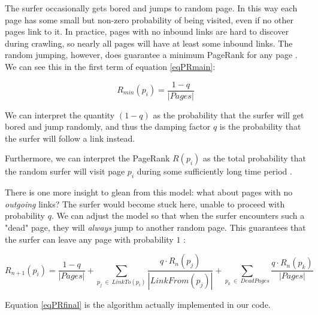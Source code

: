 The surfer occasionally gets bored and jumps to random page.  
In this way each page has some small but non-zero probability of being visited,
even if no other pages link to it.  In practice, pages with no inbound links are
hard to discover during crawling, so nearly all pages will have at least some
inbound links.  The random jumping, however, does guarantee a minimum PageRank
for any page \cite{efactory}. 
We can see this in the first term of equation \eqref{eqPRmain}:

\begin{equation}\label{eqPRmin}
    R_{min}(p_i) = \frac{1 - q}{|Pages|}
\end{equation}

We can interpret the quantity $(1 - q)$ as the probability that the surfer will
get bored and jump randomly, and thus the damping factor $q$ is the probability 
that the surfer will follow a link instead.

Furthermore, we can interpret the PageRank $R(p_i)$ as the total probability that
the random surfer will visit page $p_i$ during some sufficiently long time period \cite{efactory}.

There is one more insight to glean from this model: what about pages with no
\emph{outgoing} links?  The surfer would become stuck here, unable to proceed with
probability $q$.  We can adjust the model so that when the surfer encounters such
a "dead" page, they will \emph{always} jump to another random page.  This guarantees
that the surfer can leave any page with probability $1$ \cite{mnielsen}:

\begin{equation}\label{eqPRfinal}
    R_{n+1}(p_i) = \frac{1 - q}{|Pages|} + \sum_{p_j \: \in \: LinkTo(p_i)} \frac{ q \cdot R_n(p_j) }{ |LinkFrom(p_j)| }  + \sum_{p_k \: \in \: DeadPages} \frac{ q \cdot R_n(p_k) }{ |Pages| } 
\end{equation}

Equation \eqref{eqPRfinal} is the algorithm actually implemented in our code.
